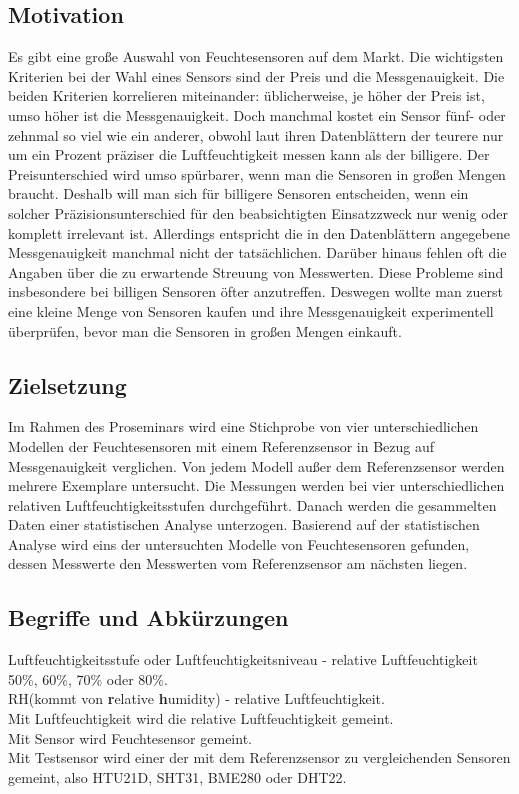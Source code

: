 \documentclass[runningheads]{llncs}
\begin{document}
\subsection{Motivation}
Es gibt eine große Auswahl von Feuchtesensoren auf dem Markt. Die wichtigsten Kriterien bei der Wahl eines Sensors sind der Preis und die Messgenauigkeit. Die beiden Kriterien korrelieren miteinander: üblicherweise, je höher der Preis ist, umso höher ist die Messgenauigkeit. Doch manchmal kostet ein Sensor fünf- oder zehnmal so viel wie ein anderer, obwohl laut ihren Datenblättern der teurere nur um ein Prozent präziser die Luftfeuchtigkeit  messen kann als der billigere. Der Preisunterschied wird umso spürbarer, wenn man die Sensoren in großen Mengen braucht. Deshalb will man sich für billigere Sensoren entscheiden, wenn ein solcher Präzisionsunterschied für den beabsichtigten Einsatzzweck nur wenig oder komplett irrelevant ist. Allerdings entspricht die in den Datenblättern angegebene Messgenauigkeit manchmal nicht der tatsächlichen. Darüber hinaus fehlen oft die Angaben über die zu erwartende Streuung von Messwerten. Diese Probleme sind insbesondere bei billigen Sensoren öfter anzutreffen. Deswegen wollte man zuerst eine kleine Menge von Sensoren kaufen und ihre Messgenauigkeit experimentell überprüfen, bevor man die Sensoren in großen Mengen einkauft.  
\subsection{Zielsetzung}
Im Rahmen des Proseminars wird eine Stichprobe von vier unterschiedlichen Modellen der Feuchtesensoren mit einem Referenzsensor in Bezug auf Messgenauigkeit verglichen. Von jedem Modell außer dem Referenzsensor werden mehrere Exemplare untersucht. Die Messungen werden bei vier unterschiedlichen relativen Luftfeuchtigkeitsstufen durchgeführt. Danach werden die gesammelten Daten einer statistischen Analyse unterzogen. Basierend auf der statistischen Analyse wird eins der untersuchten Modelle von Feuchtesensoren gefunden, dessen Messwerte den Messwerten vom Referenzsensor am nächsten liegen.
\subsection{Begriffe und Abkürzungen}
Luftfeuchtigkeitsstufe oder Luftfeuchtigkeitsniveau - relative Luftfeuchtigkeit 50\%, 60\%, 70\% oder 80\%.\\
RH(kommt von \textbf{r}elative \textbf{h}umidity) - relative Luftfeuchtigkeit.\\
Mit Luftfeuchtigkeit wird die relative Luftfeuchtigkeit gemeint.\\
Mit Sensor wird Feuchtesensor gemeint.\\
Mit Testsensor wird einer der mit dem Referenzsensor zu vergleichenden Sensoren gemeint, also HTU21D, SHT31, BME280 oder DHT22.\\
\end{document}
